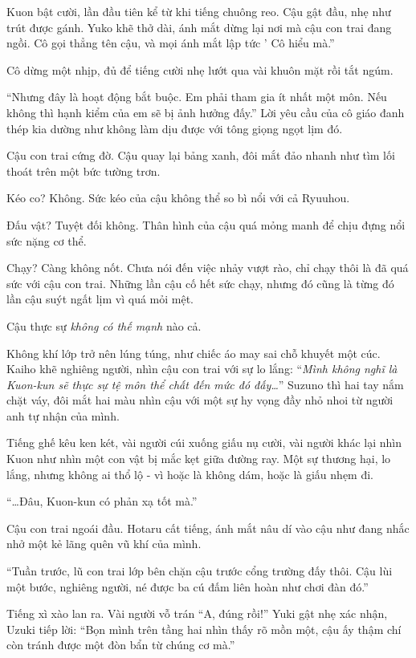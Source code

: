 \documentclass[../main.tex]{subfiles}
\begin{document}
Kuon bật cười, lần đầu tiên kể từ khi tiếng chuông reo. Cậu gật đầu, nhẹ như trút được gánh. Yuko khẽ thở dài, ánh mắt dừng lại nơi mà cậu con trai đang ngồi. Cô gọi thẳng tên cậu, và mọi ánh mắt lập tức  ' Cô hiểu mà.''

Cô dừng một nhịp, đủ để tiếng cười nhẹ lướt qua vài khuôn mặt rồi tắt ngúm.

``Nhưng đây là hoạt động bắt buộc. Em phải tham gia ít nhất một môn. Nếu không thì hạnh kiểm của em sẽ bị ảnh hưởng đấy.'' Lời yêu cầu của cô giáo đanh thép kia dường như không làm dịu được với tông giọng ngọt lịm đó.

Cậu con trai cứng đờ. Cậu quay lại bảng xanh, đôi mắt đảo nhanh như tìm lối thoát trên một bức tường trơn.

Kéo co? Không. Sức kéo của cậu không thể so bì nổi với cả Ryuuhou.

Đấu vật? Tuyệt đối không. Thân hình của cậu quá mỏng manh để chịu đựng nổi sức nặng cơ thể.

Chạy? Càng không nốt. Chưa nói đến việc nhảy vượt rào, chỉ chạy thôi là đã quá sức với cậu con trai. Những lần cậu cố hết sức chạy, nhưng đó cũng là từng đó lần cậu suýt ngất lịm vì quá mỏi mệt.

Cậu thực sự \emph{không có thế mạnh} nào cả.

Không khí lớp trở nên lúng túng, như chiếc áo may sai chỗ khuyết một cúc. Kaiho khẽ nghiêng người, nhìn cậu con trai với sự lo lắng: ``\textit{Mình không nghĩ là Kuon-kun sẽ thực sự tệ môn thể chất đến mức đó đấy\dots}'' Suzuno thì hai tay nắm chặt váy, đôi mắt hai màu nhìn cậu với một sự hy vọng đầy nhỏ nhoi từ người anh tự nhận của mình.

Tiếng ghế kêu ken két, vài người cúi xuống giấu nụ cười, vài người khác lại nhìn Kuon như nhìn một con vật bị mắc kẹt giữa đường ray. Một sự thương hại, lo lắng, nhưng không ai thổ lộ - vì hoặc là không dám, hoặc là giấu nhẹm đi.

``\dots Đâu, Kuon-kun có phản xạ tốt mà.''

Cậu con trai ngoái đầu. Hotaru cất tiếng, ánh mắt nâu dí vào cậu như đang nhắc nhở một kẻ lãng quên vũ khí của mình.

``Tuần trước, lũ con trai lớp bên chặn cậu trước cổng trường đấy thôi. Cậu lùi một bước, nghiêng người, né được ba cú đấm liên hoàn như chơi đàn đó.''

Tiếng xì xào lan ra. Vài người vỗ trán ``A, đúng rồi!'' Yuki gật nhẹ xác nhận, Uzuki tiếp lời: ``Bọn mình trên tầng hai nhìn thấy rõ mồn một, cậu ấy thậm chí còn tránh được một đòn bẩn từ chúng cơ mà.''
\end{document}
